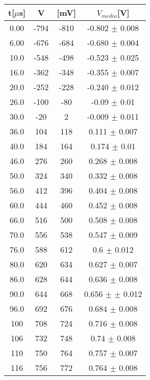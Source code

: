 \documentclass[a4paper]{article}
\theoremstyle{definition}
\begin{document}
\begin{table}[!htbp]
{\begin{minipage}{.7\linewidth}
\begin{tabular}{c|cc|c}
        t[\(\mu\)s] & V & [mV] & \(V_{medio}\)[V] \\
        \hline
        \hline
        0.00& -794& -810& -0.802 \(\pm\)  0.008\\
        \hline
        6.00& -676& -684& -0.680  \(\pm\) 0.004\\
        \hline
        10.0& -548& -498&  -0.523  \(\pm\) 0.025\\
        \hline
        16.0& -362& -348 & -0.355 \(\pm\)  0.007\\
        \hline
        20.0& -252& -228 & -0.240 \(\pm\)  0.012\\
        \hline
        26.0& -100& -80 & -0.09  \(\pm\) 0.01\\
        \hline
        30.0& -20& 2 &  -0.009  \(\pm\) 0.011\\
        \hline
        36.0& 104& 118 & 0.111  \(\pm\) 0.007\\
        \hline
        40.0& 184& 164 & 0.174  \(\pm\) 0.01\\
        \hline
        46.0& 276& 260 & 0.268 \(\pm\)  0.008 \\
        \hline
        50.0& 324& 340 &  0.332  \(\pm\) 0.008 \\
        \hline
        56.0& 412& 396 &  0.404  \(\pm\) 0.008\\
        \hline
        60.0& 444&460 & 0.452 \(\pm\)  0.008\\
        \hline
        66.0& 516& 500 & 0.508 \(\pm\)  0.008\\
        \hline
        70.0& 556& 538 &  0.547 \(\pm\)  0.009\\
        \hline
        76.0& 588& 612  & 0.6 \(\pm\)  0.012\\
        \hline
        80.0&620& 634 & 0.627 \(\pm\)  0.007\\
        \hline
        86.0& 628& 644 &0.636 \(\pm\)  0.008\\
        \hline
        90.0& 644& 668  & 0.656 \(\pm\) \(\pm\)  0.012\\
        \hline
        96.0&  692 & 676  &  0.684 \(\pm\)  0.008\\
        \hline
        100&  708&724  & 0.716  \(\pm\) 0.008\\
        \hline
        106& 732&748 &  0.74 \(\pm\)  0.008\\
        \hline
        110& 750& 764  &  0.757 \(\pm\)  0.007\\
        \hline
        116& 756& 772  &  0.764 \(\pm\)  0.008\\

\end{tabular}
\end{minipage}}
\end{table}
\end{document}
